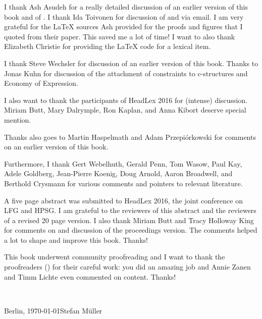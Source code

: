 I thank Ash Asudeh for a really detailed discussion of an earlier version of this book and of
. I thank Ida Toivonen for discussion of  and 
via email. I am very grateful for the \LaTeX{} sources Ash provided for the proofs and figures
that I quoted from their paper. This saved me a lot of time! I want to also thank Elizabeth Christie
for providing the \LaTeX{} code for a lexical item.

I thank Steve Wechsler for discussion of an earlier version of this book. Thanks to Jonas Kuhn for
discussion of the attachment of constraints to c-structures and Economy of Expression.

I also want to thank the participants of HeadLex 2016 for (intense) discussion. Miriam Butt, Mary Dalrymple,
 Ron Kaplan, and Anna Kibort deserve special mention.

Thanks also goes to Martin Haspelmath and Adam Przepiórkowski for comments on an earlier version of this book.

Furthermore, I thank Gert Webelhuth, Gerald Penn, Tom Wasow, Paul Kay, %
Adele Goldberg, Jean-Pierre Koenig, Doug Arnold, Aaron Broadwell, and Berthold Crysmann for various
comments and pointers to relevant literature.

A five page abstract was submitted to HeadLex 2016, the joint conference on LFG and HPSG. I am
grateful to the reviewers of this abstract and the reviewers of a revised 20 page version. I also
thank Miriam Butt and Tracy Holloway King for comments on and discussion of the proceedings version.  The
comments helped a lot to shape and improve this book. Thanks!  

This book underwent community proofreading and I want to thank the proofreaders
(\makeatletter\@proofreader\makeatother) for their careful work: you did an amazing job and Annie
Zanen and Timm Lichte even commented on content. Thanks!


~\medskip

\noindent
Berlin, \today\hfill Stefan Müller


\mainmatter


